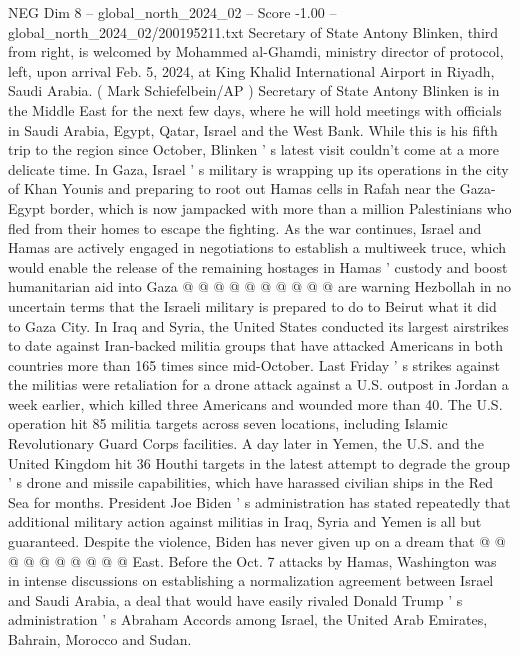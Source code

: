 \begin{textsample}{NEG Dim 8 – global\_north\_2024\_02 – Score -1.00 – global\_north\_2024\_02/200195211.txt}  \label{ex:f8_neg_232}
Secretary of State Antony Blinken, third from right, is welcomed by Mohammed al-Ghamdi, ministry director of protocol, left, upon arrival Feb. 5, 2024, at King Khalid International Airport in Riyadh, Saudi Arabia. ( Mark Schiefelbein/AP ) Secretary of State Antony Blinken is in the Middle East for the next few days, where he will hold meetings with officials in Saudi Arabia, Egypt, Qatar, Israel and the West Bank.
While this is his fifth trip to the region since October, Blinken ' s latest visit couldn't come at a more delicate time.
In Gaza, Israel ' s military is wrapping up its operations in the city of Khan Younis and preparing to root out Hamas cells in Rafah near the Gaza-Egypt border, which is now jampacked with more than a million Palestinians who fled from their homes to escape the fighting.
As the war continues, Israel and Hamas are actively engaged in negotiations to establish a multiweek truce, which would enable the release of the remaining hostages in Hamas ' custody and boost humanitarian aid into Gaza @ @ @ @ @ @ @ @ @ @ are warning Hezbollah in no uncertain terms that the Israeli military is prepared to do to Beirut what it did to Gaza City.
In Iraq and Syria, the United States conducted its largest airstrikes to date against Iran-backed militia groups that have attacked Americans in both countries more than 165 times since mid-October.
Last Friday ' s strikes against the militias were retaliation for a drone attack against a U.S. outpost in Jordan a week earlier, which killed three Americans and wounded more than 40.
The U.S. operation hit 85 militia targets across seven locations, including Islamic Revolutionary Guard Corps facilities.
A day later in Yemen, the U.S. and the United Kingdom hit 36 Houthi targets in the latest attempt to degrade the group ' s drone and missile capabilities, which have harassed civilian ships in the Red Sea for months.
President Joe Biden ' s administration has stated repeatedly that additional military action against militias in Iraq, Syria and Yemen is all but guaranteed.
Despite the violence, Biden has never given up on a dream that @ @ @ @ @ @ @ @ @ @ East.
Before the Oct. 7 attacks by Hamas, Washington was in intense discussions on establishing a normalization agreement between Israel and Saudi Arabia, a deal that would have easily rivaled Donald Trump ' s administration ' s Abraham Accords among Israel, the United Arab Emirates, Bahrain, Morocco and Sudan.

\end{textsample}
